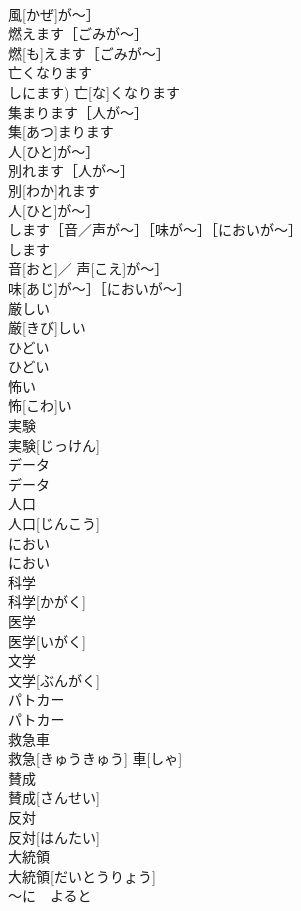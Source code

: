 \documentclass[8pt]{extreport}
\begin{document}
\begin{CJK}{UTF8}{min}
\\	風[かぜ]が〜］	
\\	燃えます［ごみが〜］	
\\	燃[も]えます［ごみが〜］	
\\	亡くなります	
\\	しにます)	亡[な]くなります	
\\	集まります［人が〜］	
\\	集[あつ]まります
\\	人[ひと]が〜］	
\\	別れます［人が〜］	
\\	別[わか]れます
\\	人[ひと]が〜］	
\\	します［音／声が〜］［味が〜］［においが〜］	
\\	します
\\	音[おと]／ 声[こえ]が〜］
\\	味[あじ]が〜］［においが〜］	
\\	厳しい	
\\	厳[きび]しい	
\\	ひどい	
\\	ひどい	
\\	怖い	
\\	怖[こわ]い	
\\	実験	
\\	実験[じっけん]	
\\	データ	
\\	データ	
\\	人口	
\\	人口[じんこう]	
\\	におい	
\\	におい	
\\	科学	
\\	科学[かがく]	
\\	医学	
\\	医学[いがく]	
\\	文学	
\\	文学[ぶんがく]	
\\	パトカー	
\\	パトカー	
\\	救急車	
\\	救急[きゅうきゅう] 車[しゃ]	
\\	賛成	
\\	賛成[さんせい]	
\\	反対	
\\	反対[はんたい]	
\\	大統領	
\\	大統領[だいとうりょう]	
\\	〜に　よると	

\end{CJK}
\end{document}

